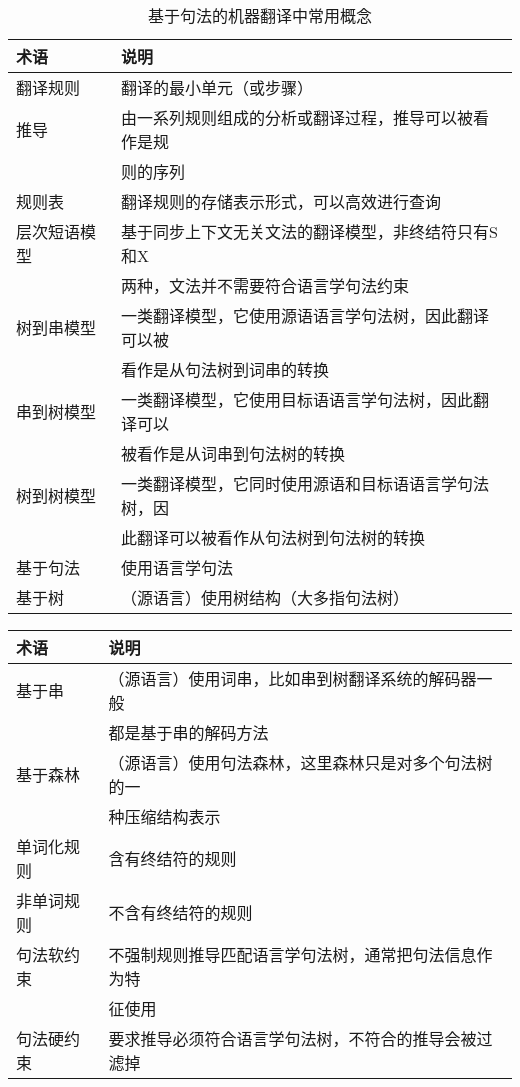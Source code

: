 \begin{table}[htp]{
\begin{center}
\caption{基于句法的机器翻译中常用概念}
\label{tab:8-2}
{
\begin{tabular}{p{6.5em} | l}
术语 & 说明 \\
\hline
\rule{0pt}{15pt}翻译规则 & 翻译的最小单元（或步骤） \\
\rule{0pt}{15pt}推导 & 由一系列规则组成的分析或翻译过程，推导可以被看作是规\\
&则的序列 \\
\rule{0pt}{15pt}规则表 & 翻译规则的存储表示形式，可以高效进行查询 \\
\rule{0pt}{15pt}层次短语模型 & 基于同步上下文无关文法的翻译模型，非终结符只有S和X\\
&两种，文法并不需要符合语言学句法约束 \\
\rule{0pt}{15pt}树到串模型 & 一类翻译模型，它使用源语语言学句法树，因此翻译可以被\\
&看作是从句法树到词串的转换 \\
\rule{0pt}{15pt}串到树模型 & 一类翻译模型，它使用目标语语言学句法树，因此翻译可以\\
&被看作是从词串到句法树的转换 \\
\rule{0pt}{15pt}树到树模型 & 一类翻译模型，它同时使用源语和目标语语言学句法树，因\\
&此翻译可以被看作从句法树到句法树的转换 \\
\rule{0pt}{15pt}基于句法 & 使用语言学句法 \\
\rule{0pt}{15pt}基于树 &（源语言）使用树结构（大多指句法树） \\
\end{tabular}
}
\end{center}
}\end{table}
\begin{table}[htp]{
\begin{center}
{
\begin{tabular}{p{6.5em} | l}
术语 & 说明 \\
\hline
\rule{0pt}{15pt}基于串 &（源语言）使用词串，比如串到树翻译系统的解码器一般\\
&都是基于串的解码方法 \\
\rule{0pt}{15pt}基于森林 &（源语言）使用句法森林，这里森林只是对多个句法树的一 \\
                         & 种压缩结构表示 \\
\rule{0pt}{15pt}单词化规则 & 含有终结符的规则 \\
\rule{0pt}{15pt}非单词规则 & 不含有终结符的规则 \\
\rule{0pt}{15pt}句法软约束 & 不强制规则推导匹配语言学句法树，通常把句法信息作为特\\
&征使用 \\
\rule{0pt}{15pt}句法硬约束 & 要求推导必须符合语言学句法树，不符合的推导会被过滤掉 \\
\end{tabular}
}
\end{center}
}\end{table}

